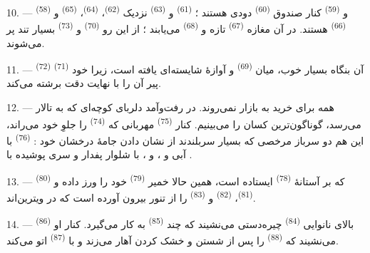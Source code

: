 \VUsaut{4.0mm}
\VUsaut{3.0mm}

10. ---  \textsuperscript{(58)} و 
\textsuperscript{(59)} کنار صندوق 
\textsuperscript{(60)} دودی هستند ؛ 
\textsuperscript{(61)} و  \textsuperscript{(63)} نزدیک
 \textsuperscript{(62)}، 
\textsuperscript{(64)}،  \textsuperscript{(65)} و
 \textsuperscript{(66)} هستند. در آن مغازه
 \textsuperscript{(67)} تازه و 
\textsuperscript{(68)} می‌یابند ؛ از این رو 
\textsuperscript{(70)} و  \textsuperscript{(73)}
بسیار تند پر می‌شوند.

11. ---  \textsuperscript{(72)} آن بنگاه بسیار خوب، میان
 \textsuperscript{(69)} و  آوازهٔ
شایسته‌ای یافته است، زیرا خود  \textsuperscript{(71)} پیر
آن را با نهایت دقت برشته می‌کند.

\VUsaut{4.0mm}
\VUsaut{3.0mm}

12. --- همه برای خرید به بازار نمی‌روند. در رفت‌وآمد دلربای کوچه‌ای که
به تالار می‌رسد، گوناگون‌ترین کسان را می‌بینیم. کنار  \textsuperscript{(75)} مهربانی که 
\textsuperscript{(74)} را جلوِ خود می‌راند، این هم دو سرباز مرخصی که
بسیار سربلندند از نشان دادن جامهٔ درخشان خود : 
\textsuperscript{(76)} با  آبی و ،
و ، با شلوار پفدار و سری پوشیده با .

13. ---  \textsuperscript{(80)} که بر آستانهٔ
 \textsuperscript{(78)} ایستاده است، همین حالا خمیر
 \textsuperscript{(79)} خود را ورز داده و 
\textsuperscript{(81)}،  \textsuperscript{(82)} و
 \textsuperscript{(83)} را از تنور بیرون آورده است
که در ویترین‌اند.

14. --- بالای نانوایی  \textsuperscript{(84)}
چیره‌دستی می‌نشیند که چند  \textsuperscript{(85)} به
کار می‌گیرد. کنار او  \textsuperscript{(86)}
می‌نشیند که  \textsuperscript{(88)} را پس از شستن و خشک
کردن آهار می‌زند و با  \textsuperscript{(87)} اتو می‌کند.

\VUsaut{4.0mm}
\VUsaut{3.0mm}

